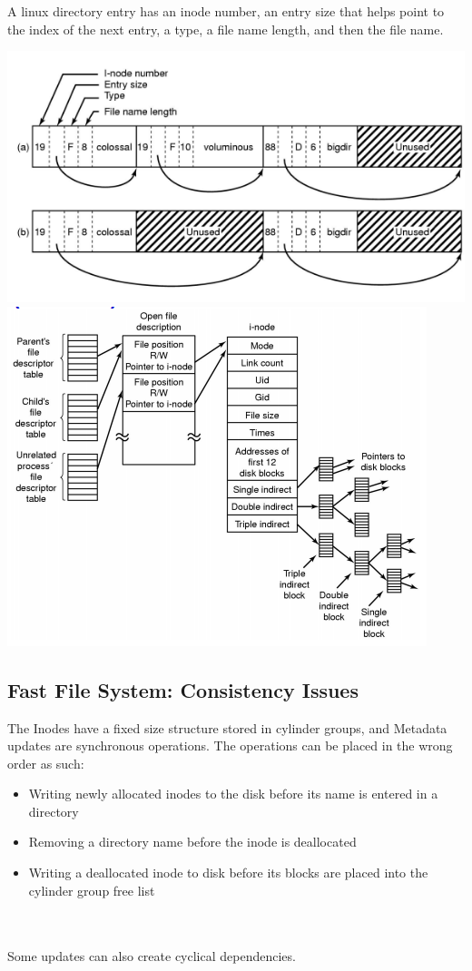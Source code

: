 \documentclass{article}
\begin{document}
A linux directory entry has an inode number, an entry size that helps point to the index of the next entry, a type, a file name length, and then the file name.

\includegraphics[scale=0.75]{yes1}\\

\includegraphics[scale=0.75]{yes2}
\subsection{Fast File System: Consistency Issues}

The Inodes have a fixed size structure stored in cylinder groups, and Metadata updates are synchronous operations. The operations can be placed in the wrong order as such:
\begin{itemize}
    \item Writing newly allocated inodes to the disk before its name is entered in a directory
    \item Removing a directory name before the inode is deallocated
    \item Writing a deallocated inode to disk before its blocks are placed into the cylinder group free list
\end{itemize}
\\
\\
Some updates can also create cyclical dependencies.
\end{document}

